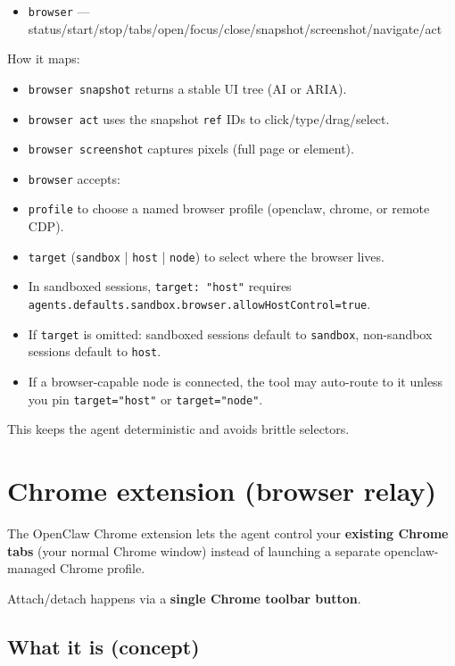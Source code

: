 \begin{itemize}
  \item \texttt{browser} — status/start/stop/tabs/open/focus/close/snapshot/screenshot/navigate/act
\end{itemize}


How it maps:

\begin{itemize}
  \item \texttt{browser snapshot} returns a stable UI tree (AI or ARIA).
  \item \texttt{browser act} uses the snapshot \texttt{ref} IDs to click/type/drag/select.
  \item \texttt{browser screenshot} captures pixels (full page or element).
  \item \texttt{browser} accepts:
  \item \texttt{profile} to choose a named browser profile (openclaw, chrome, or remote CDP).
  \item \texttt{target} (\texttt{sandbox} | \texttt{host} | \texttt{node}) to select where the browser lives.
  \item In sandboxed sessions, \texttt{target: "host"} requires \texttt{agents.defaults.sandbox.browser.allowHostControl=true}.
  \item If \texttt{target} is omitted: sandboxed sessions default to \texttt{sandbox}, non-sandbox sessions default to \texttt{host}.
  \item If a browser-capable node is connected, the tool may auto-route to it unless you pin \texttt{target="host"} or \texttt{target="node"}.
\end{itemize}


This keeps the agent deterministic and avoids brittle selectors.


\clearpage

\section{Chrome extension (browser relay)}


The OpenClaw Chrome extension lets the agent control your \textbf{existing Chrome tabs} (your normal Chrome window) instead of launching a separate openclaw-managed Chrome profile.

Attach/detach happens via a \textbf{single Chrome toolbar button}.

\subsection{What it is (concept)}



